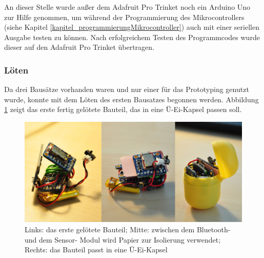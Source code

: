 An dieser Stelle wurde außer dem Adafruit Pro Trinket noch ein Arduino Uno zur Hilfe genommen, um während der Programmierung des Mikrocontrollers (siehe Kapitel \ref{kapitel_programmierungMikrocontroller}) auch mit einer seriellen Ausgabe testen zu können. Nach erfolgreichem Testen des Programmcodes wurde dieser auf den Adafruit Pro Trinket übertragen.

\subsubsection{Löten}

Da drei Bausätze vorhanden waren und nur einer für das Prototyping genutzt wurde, konnte mit dem Löten des ersten Bausatzes begonnen werden. Abbildung \ref{fig:k3_erstesBauteilGeloetet} zeigt das erste fertig gelötete Bauteil, das in eine Ü-Ei-Kapsel passen soll.

\begin{figure}[ht]
	\centering
	\includegraphics[width=1\textwidth]{images/k3-erstesBauteilGeloetet.jpg}
	\caption {Links: das erste gelötete Bauteil; Mitte: zwischen dem Bluetooth- und dem Sensor-
		Modul wird Papier zur Isolierung verwendet; Rechts: das Bauteil passt in eine Ü-Ei-Kapsel}
	\label{fig:k3_erstesBauteilGeloetet}
\end{figure}